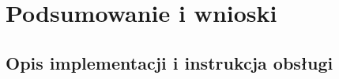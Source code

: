 \documentclass[12pt, a4paper]{article}
\begin{document}
\section{Podsumowanie i wnioski}

\begin{appendices}
\section{Opis implementacji i instrukcja obsługi}
\end{appendices}



\end{document}
